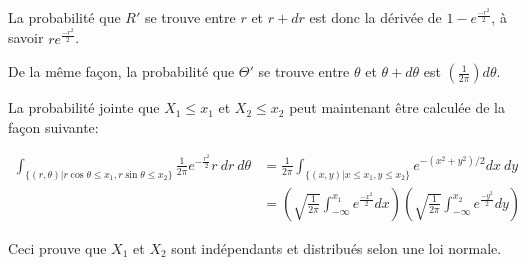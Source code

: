 La probabilité que $R'$ se trouve entre $r$ et $r+dr$ est donc la dérivée de $1-e^{\frac{-r^2}{2}}$, à savoir $re^{\frac{-r^2}{2}}$.

De la même façon, la probabilité que $\Theta'$ se trouve entre $\theta$ et $\theta+d\theta$ est $(\frac{1}{2\pi})d\theta$.
\vspace{0.3cm}

La probabilité jointe que $X_1\leq x_1$ et $X_2\leq x_2$ peut maintenant être calculée de la façon suivante:

\begin{align}
 \int_{\{(r,\theta)|r \cos{\theta} \leq x_1, r\sin{\theta} \leq x_2\}} \frac{1}{2\pi}e^{-\frac{r^2}{2}}r\ dr\ d\theta
 & = \frac{1}{2\pi}\int_{\{(x,y)|x \leq x_1, y \leq x_2\}}e^{-(x^2+y^2)/2}dx\ dy \nonumber\\
 & = \left(\sqrt{\frac{1}{2\pi}} \int_{-\infty}^{x_1} e^{\frac{-x^2}{2}}dx \right)\left(\sqrt{\frac{1}{2\pi}} \int_{-\infty}^{x_2} e^{\frac{-y^2}{2}}dy \right) \nonumber
\end{align}
\vspace{0.3cm}

Ceci prouve que $X_1$ et $X_2$ sont indépendants et distribués selon une loi normale.
